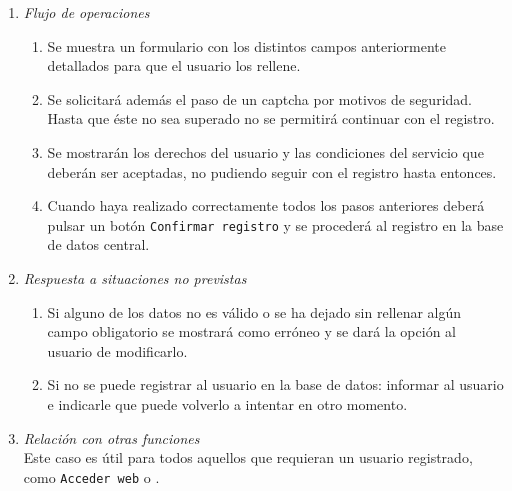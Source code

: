\begin{enumerate}
		\item \textit{Flujo de operaciones}
			\begin{enumerate}
				\item Se muestra un formulario con los distintos campos anteriormente detallados para que el usuario los rellene. 
				\item Se solicitará además el paso de un \gls{captcha} por motivos de seguridad. Hasta que éste no sea superado no se permitirá continuar con el registro.
				\item Se mostrarán los derechos del usuario y las condiciones del servicio que deberán ser aceptadas, no pudiendo seguir con el registro hasta entonces.
				\item Cuando haya realizado correctamente todos los pasos anteriores deberá pulsar un botón \verb|Confirmar registro| y se procederá al registro en la base de datos central.
			\end{enumerate}
		\item \textit{Respuesta a situaciones no previstas}
			\begin{enumerate}
				\item Si alguno de los datos no es válido o se ha dejado sin rellenar algún campo obligatorio se mostrará como erróneo y se dará la opción al usuario de modificarlo.
				\item Si no se puede registrar al usuario en la base de datos: informar al usuario e indicarle que puede volverlo a intentar en otro momento.
			\end{enumerate}
		\item \textit{Relación con otras funciones}\\
			Este caso es útil para todos aquellos que requieran un usuario registrado, como \verb|Acceder web| o .
	\end{enumerate}
